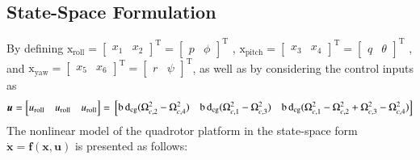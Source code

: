 \documentclass[3p]{elsarticle}
\begin{document}
\subsection{State-Space Formulation}\label{sec:state-space}
\noindent By defining $\boldsymbol{\mathrm{x}}_{\text{roll}} = \begin{bmatrix}
    x_1 & x_2
\end{bmatrix}^{\mathrm{T}}=
\begin{bmatrix}
    p & \phi
\end{bmatrix}^{\mathrm{T}}$
,
$\boldsymbol{\mathrm{x}}_{\text{pitch}} = \begin{bmatrix}
    x_3 & x_4 \end{bmatrix}^{\mathrm{T}} = 
    \begin{bmatrix}
    q & \theta \end{bmatrix}^{\mathrm{T}}
    $
    , and
    $\boldsymbol{\mathrm{x}}_{\text{yaw}} = 
    \begin{bmatrix}
        x_5 & x_6
    \end{bmatrix}^{\mathrm{T}} = 
    \begin{bmatrix}
        r & \psi
    \end{bmatrix}^{\mathrm{T}}$, as well as by considering the control inputs as $$\boldsymbol{u} = \begin{bmatrix}
        u_{\text{roll}} & u_{\text{roll}} & u_{\text{roll}}
    \end{bmatrix} = \\ \begin{bmatrix}
        \mathrm{b\,d}_{\text{cg}}(\Omega_{c, 2}^2 - \Omega_{c, 4}^2) & \mathrm{b\,d}_{\text{cg}}(\Omega_{c, 1}^2 - \Omega_{c, 3}^2) &
        \mathrm{b\,d}_{\text{cg}}(\Omega_{c, 1}^2 - \Omega_{c, 2}^2+ \Omega_{c, 3}^2 - \Omega_{c, 4}^2)
    \end{bmatrix}$$
    The nonlinear model of the quadrotor platform in the state-space form $\dot{\boldsymbol{x}} = \boldsymbol{f}(\boldsymbol{x}, \boldsymbol{u})$ is presented as follows:
\end{document}
